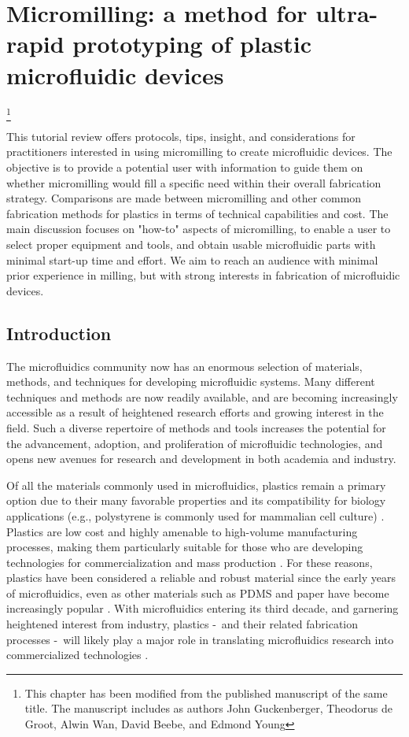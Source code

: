 \chapter{Micromilling: a method for ultra-rapid prototyping of plastic microfluidic devices}\footnote{This chapter has been modified from the published manuscript of the same title. The manuscript includes as authors John Guckenberger, Theodorus de Groot, Alwin Wan, David Beebe, and Edmond Young}
\label{Chap:Micromilling}

This tutorial review offers protocols, tips, insight, and considerations for practitioners interested in using micromilling to create microfluidic devices. The objective is to provide a potential user with information to guide them on whether micromilling would fill a specific need within their overall fabrication strategy. Comparisons are made between micromilling and other common fabrication methods for plastics in terms of technical capabilities and cost. The main discussion focuses on "how-to" aspects of micromilling, to enable a user to select proper equipment and tools, and obtain usable microfluidic parts with minimal start-up time and effort. We aim to reach an audience with minimal prior experience in milling, but with strong interests in fabrication of microfluidic devices.

\section{Introduction}
The microfluidics community now has an enormous selection of materials, methods, and techniques for developing microfluidic systems. Many different techniques and methods are now readily available, and are becoming increasingly accessible as a result of heightened research efforts and growing interest in the field. Such a diverse repertoire of methods and tools increases the potential for the advancement, adoption, and proliferation of microfluidic technologies, and opens new avenues for research and development in both academia and industry. 

Of all the materials commonly used in microfluidics, plastics remain a primary option due to their many favorable properties and its compatibility for biology applications (e.g., polystyrene is commonly used for mammalian cell culture) \cite{Young2011}. Plastics are low cost and highly amenable to high-volume manufacturing processes, making them particularly suitable for those who are developing technologies for commercialization and mass production \cite{Mukhopadhyay2007}. For these reasons, plastics have been considered a reliable and robust material since the early years of microfluidics, even as other materials such as PDMS and paper have become increasingly popular \cite{Becker2000a, Berthier2012}. With microfluidics entering its third decade, and garnering heightened interest from industry, plastics -\, and their related fabrication processes \hyphen\, will likely play a major role in translating microfluidics research into commercialized technologies \cite{Sackmann2014}.



